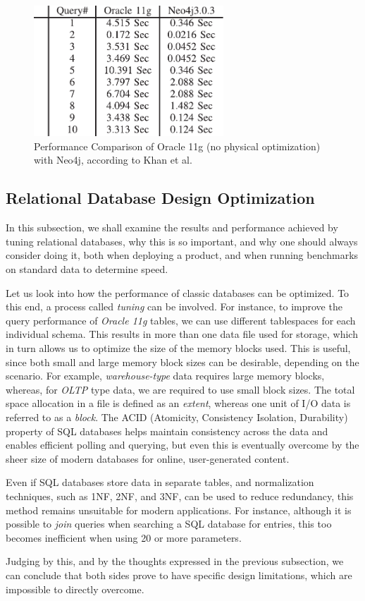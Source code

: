 \documentclass[10pt,        %
               a4paper,     %
               journal,     %
               ]{IEEEtran}
\begin{document}
\begin{figure}[!t]
	\centering
	\includegraphics[width=2.8in]{plots/no tuning table}
	\caption{Performance Comparison of Oracle 11g (no physical optimization) with Neo4j, according to Khan et al. \cite
	{IEEEpaper1:comparison}}
	\label{table_no_phys_vs_neo4j}
\end{figure}


\subsection{Relational Database Design Optimization}
In this subsection, we shall examine the results and performance achieved by tuning relational databases, why this is so important, and why one should always consider doing it, both when deploying a product, and when running benchmarks on standard data to determine speed. \par
Let us look into how the performance of classic databases can be optimized. To this end, a process called \textit{tuning} can be involved. For instance, to improve the query performance of \textit{Oracle 11g} tables, we can use different tablespaces for each individual schema.  This results in more than one data file used for storage, which in turn allows us to optimize the size of the memory blocks used. This is useful, since both small and large memory block sizes can be desirable, depending on the scenario. For example, \textit{warehouse-type} data requires large memory blocks, whereas, for \textit{OLTP} type data, we are required to use small block sizes. The total space allocation in a file is defined as an \textit{extent}, whereas one unit of I/O data is referred to as a \textit{block}. 
The ACID (Atomicity, Consistency Isolation, Durability) property of SQL databases helps maintain consistency across the data and enables efficient polling and querying, but even this is eventually overcome by the sheer size of modern databases for online, user-generated content. \par
Even if SQL databases store data in separate tables, and normalization techniques, such as 1NF, 2NF, and 3NF, can be used to reduce redundancy, this method remains unsuitable for modern applications. For instance, although it is possible to \textit{join} queries when searching a SQL database for entries, this too becomes inefficient when using 20 or more parameters. \par
Judging by this, and by the thoughts expressed in the previous subsection, we can conclude that both sides prove to have specific design limitations, which are impossible to directly overcome. \par
\end{document}
